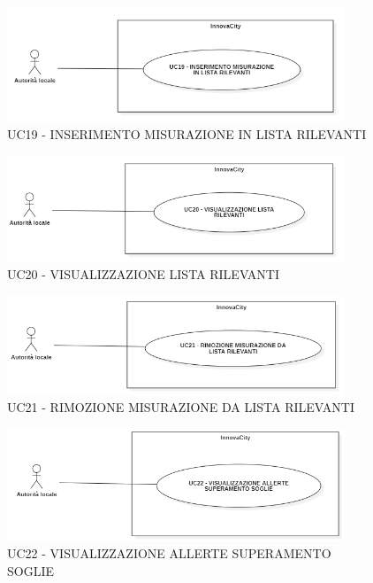 \begin{figure}[H]
    \centering
    \includegraphics[width=0.9\textwidth]{../Images/uc19.PNG}
    \caption{UC19 - INSERIMENTO MISURAZIONE IN LISTA RILEVANTI}
    \label{fig:UC7}
\end{figure}

\begin{figure}[H]
    \centering
    \includegraphics[width=0.9\textwidth]{../Images/uc20.PNG}
    \caption{UC20 - VISUALIZZAZIONE LISTA RILEVANTI}
    \label{fig:UC7}
\end{figure}

\begin{figure}[H]
    \centering
    \includegraphics[width=0.9\textwidth]{../Images/uc21.PNG}
    \caption{UC21 - RIMOZIONE MISURAZIONE DA LISTA RILEVANTI}
    \label{fig:UC7}
\end{figure}

\begin{figure}[H]
    \centering
    \includegraphics[width=0.9\textwidth]{../Images/uc22.PNG}
    \caption{UC22 - VISUALIZZAZIONE ALLERTE SUPERAMENTO SOGLIE}
    \label{fig:UC7}
\end{figure}



